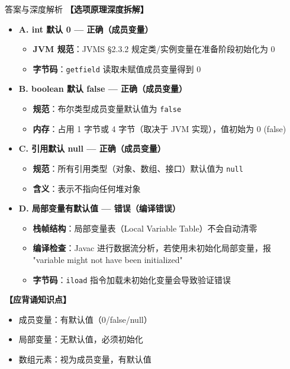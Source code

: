 \documentclass[12pt, a4paper]{ctexart}
\newcommand{\code}[1]{\texttt{#1}}
\begin{document}
\begin{enumerate}[label=\textbf{\arabic*.}, leftmargin=*, itemsep=1.5em]
\begin{bluebox}{答案与深度解析}
\textbf{【选项原理深度拆解】}
\begin{itemize}[leftmargin=*, nosep]
    \item \textbf{A. int 默认 0 — 正确（成员变量）}
    \begin{itemize}[leftmargin=*, nosep]
        \item \textbf{JVM 规范}：JVMS §2.3.2 规定类/实例变量在准备阶段初始化为 0
        \item \textbf{字节码}：\code{getfield} 读取未赋值成员变量得到 0
    \end{itemize}
    \item \textbf{B. boolean 默认 false — 正确（成员变量）}
    \begin{itemize}[leftmargin=*, nosep]
        \item \textbf{规范}：布尔类型成员变量默认值为 \code{false}
        \item \textbf{内存}：占用 1 字节或 4 字节（取决于 JVM 实现），值初始为 0 (false)
    \end{itemize}
    \item \textbf{C. 引用默认 null — 正确（成员变量）}
    \begin{itemize}[leftmargin=*, nosep]
        \item \textbf{规范}：所有引用类型（对象、数组、接口）默认值为 \code{null}
        \item \textbf{含义}：表示不指向任何堆对象
    \end{itemize}
    \item \textbf{D. 局部变量有默认值 — 错误（编译错误）}
    \begin{itemize}[leftmargin=*, nosep]
        \item \textbf{栈帧结构}：局部变量表（Local Variable Table）不会自动清零
        \item \textbf{编译检查}：Javac 进行数据流分析，若使用未初始化局部变量，报 "variable might not have been initialized"
        \item \textbf{字节码}：\code{iload} 指令加载未初始化变量会导致验证错误
    \end{itemize}
\end{itemize}

\textbf{【应背诵知识点】}
\begin{itemize}[leftmargin=*, nosep]
    \item 成员变量：有默认值（0/false/null）
    \item 局部变量：无默认值，必须初始化
    \item 数组元素：视为成员变量，有默认值
\end{itemize}
\end{bluebox}


\end{enumerate}
\end{document}
